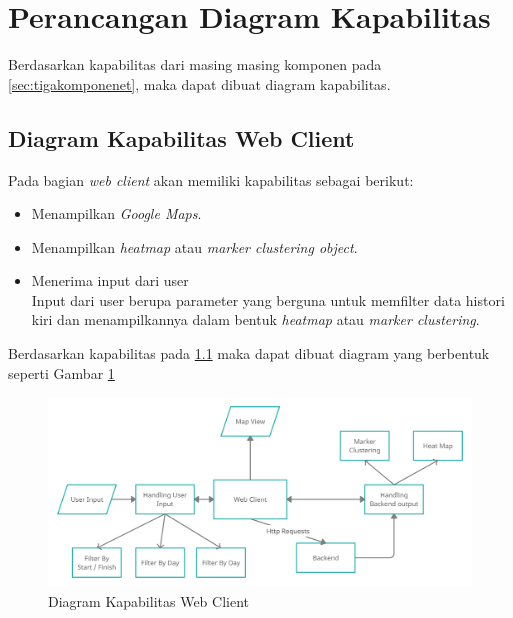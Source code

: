 \section{Perancangan Diagram Kapabilitas}
\label{sec:kapabilitasDiagram}
Berdasarkan kapabilitas dari masing masing komponen pada \ref{sec:tigakomponenet}, maka dapat dibuat diagram kapabilitas.

\subsection{Diagram Kapabilitas Web Client}
\label{sec:webclientCapability}
Pada bagian \textit{web client} akan memiliki kapabilitas sebagai berikut:
\begin{itemize}
    \item Menampilkan \textit{Google Maps}.
    \item Menampilkan \textit{heatmap} atau \textit{marker clustering object}.
    \item Menerima input dari user\\
    Input dari user berupa parameter yang berguna untuk memfilter data histori kiri dan menampilkannya dalam bentuk \textit{heatmap} atau \textit{marker clustering}.
\end{itemize}

Berdasarkan kapabilitas pada \ref{sec:webclientCapability} maka dapat dibuat diagram yang berbentuk seperti Gambar \ref{fig:webclientcapabiltydiagram}

\begin{figure}[H]
	\centering  
	\includegraphics[scale=0.25]{Gambar/kiri_web_client_capability.png}  
	\caption[Rancangan Diagram Kapabilitas]{Diagram Kapabilitas Web Client} 
	\label{fig:webclientcapabiltydiagram} 
\end{figure}

